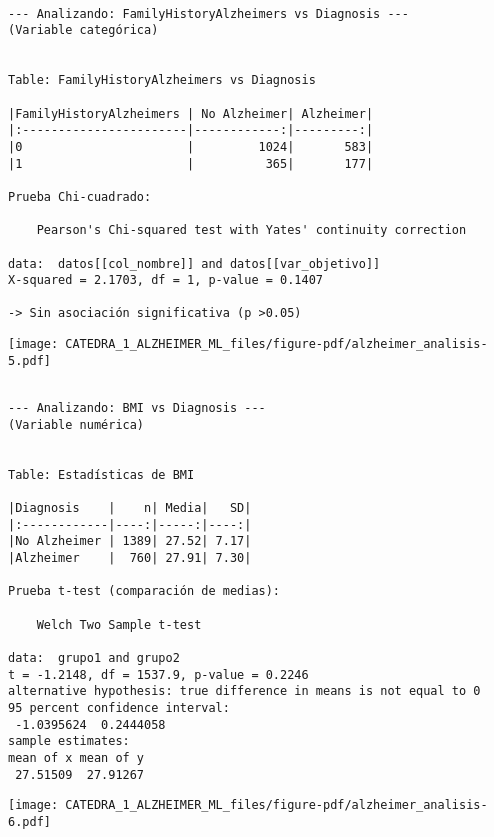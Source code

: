 \documentclass[
  letterpaper,
  DIV=11,
  numbers=noendperiod]{scrartcl}
\begin{document}
\begin{verbatim}

--- Analizando: FamilyHistoryAlzheimers vs Diagnosis ---
(Variable categórica)


Table: FamilyHistoryAlzheimers vs Diagnosis

|FamilyHistoryAlzheimers | No Alzheimer| Alzheimer|
|:-----------------------|------------:|---------:|
|0                       |         1024|       583|
|1                       |          365|       177|

Prueba Chi-cuadrado:

    Pearson's Chi-squared test with Yates' continuity correction

data:  datos[[col_nombre]] and datos[[var_objetivo]]
X-squared = 2.1703, df = 1, p-value = 0.1407

-> Sin asociación significativa (p >0.05)
\end{verbatim}

\begin{center}
\texttt{[image: CATEDRA\_1\_ALZHEIMER\_ML\_files/figure-pdf/alzheimer\_analisis-5.pdf]}
\end{center}

\begin{verbatim}

--- Analizando: BMI vs Diagnosis ---
(Variable numérica)


Table: Estadísticas de BMI

|Diagnosis    |    n| Media|   SD|
|:------------|----:|-----:|----:|
|No Alzheimer | 1389| 27.52| 7.17|
|Alzheimer    |  760| 27.91| 7.30|

Prueba t-test (comparación de medias):

    Welch Two Sample t-test

data:  grupo1 and grupo2
t = -1.2148, df = 1537.9, p-value = 0.2246
alternative hypothesis: true difference in means is not equal to 0
95 percent confidence interval:
 -1.0395624  0.2444058
sample estimates:
mean of x mean of y 
 27.51509  27.91267 
\end{verbatim}

\begin{center}
\texttt{[image: CATEDRA\_1\_ALZHEIMER\_ML\_files/figure-pdf/alzheimer\_analisis-6.pdf]}
\end{center}
\end{document}
